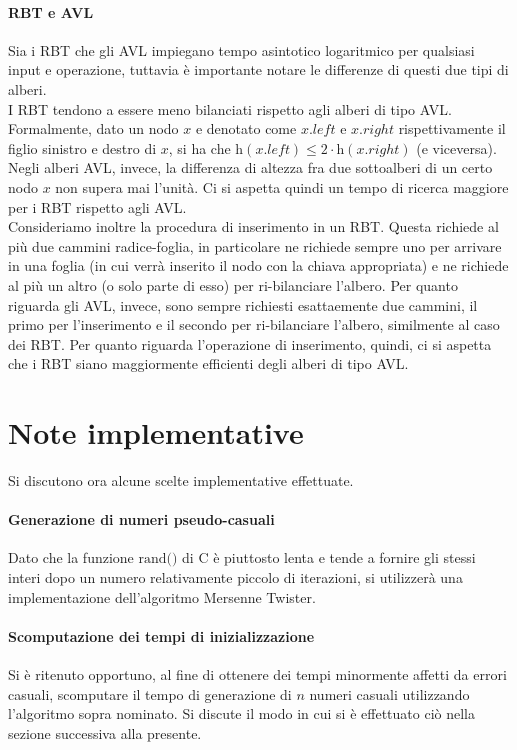 \documentclass{article}
\begin{document}
	\paragraph{RBT e AVL}	
	Sia i RBT che gli AVL impiegano tempo asintotico logaritmico per qualsiasi input e operazione, tuttavia è importante notare le differenze di questi due tipi di alberi.\\
	I RBT tendono a essere meno bilanciati rispetto agli alberi di tipo AVL. Formalmente, dato un nodo $x$ e denotato come $x.left$ e $x.right$ rispettivamente il figlio sinistro e destro di $x$, si ha che $\text{h}\left(x.left\right) \leq 2\cdot \text{h}\left(x.right\right)$ (e viceversa). Negli alberi AVL, invece, la differenza di altezza fra due sottoalberi di un certo nodo $x$ non supera mai l'unità. Ci si aspetta quindi un tempo di ricerca maggiore per i RBT rispetto agli AVL. \\
	Consideriamo inoltre la procedura di inserimento in un RBT. Questa richiede al più due cammini radice-foglia, in particolare ne richiede sempre uno per arrivare in una foglia (in cui verrà inserito il nodo con la chiava appropriata) e ne richiede al più un altro (o solo parte di esso) per ri-bilanciare l'albero. Per quanto riguarda gli AVL, invece, sono sempre richiesti esattaemente due cammini, il primo per l'inserimento e il secondo per ri-bilanciare l'albero, similmente al caso dei RBT. Per quanto riguarda l'operazione di inserimento, quindi, ci si aspetta che i RBT siano maggiormente efficienti degli alberi di tipo AVL.
	
	\newpage
	
	\section{Note implementative}
	\label{section:impl_notes}
	Si discutono ora alcune scelte implementative effettuate.
	
	\paragraph{Generazione di numeri pseudo-casuali}
	Dato che la funzione $\text{rand()}$ di C è piuttosto lenta e tende a fornire gli stessi interi dopo un numero relativamente piccolo di iterazioni, si utilizzerà una implementazione dell'algoritmo Mersenne Twister.
	
	\paragraph{Scomputazione dei tempi di inizializzazione}
	Si è ritenuto opportuno, al fine di ottenere dei tempi minormente affetti da errori casuali, scomputare il tempo di generazione di $n$ numeri casuali utilizzando l'algoritmo sopra nominato. Si discute il modo in cui si è effettuato ciò nella sezione successiva alla presente.
	
\end{document}
